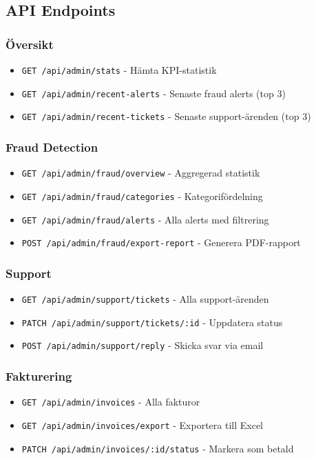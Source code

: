 \documentclass[12pt,a4paper]{article}
\begin{document}
\subsection{API Endpoints}

\subsubsection{Översikt}
\begin{itemize}
  \item \texttt{GET /api/admin/stats} - Hämta KPI-statistik
  \item \texttt{GET /api/admin/recent-alerts} - Senaste fraud alerts (top 3)
  \item \texttt{GET /api/admin/recent-tickets} - Senaste support-ärenden (top 3)
\end{itemize}

\subsubsection{Fraud Detection}
\begin{itemize}
  \item \texttt{GET /api/admin/fraud/overview} - Aggregerad statistik
  \item \texttt{GET /api/admin/fraud/categories} - Kategorifördelning
  \item \texttt{GET /api/admin/fraud/alerts} - Alla alerts med filtrering
  \item \texttt{POST /api/admin/fraud/export-report} - Generera PDF-rapport
\end{itemize}

\subsubsection{Support}
\begin{itemize}
  \item \texttt{GET /api/admin/support/tickets} - Alla support-ärenden
  \item \texttt{PATCH /api/admin/support/tickets/:id} - Uppdatera status
  \item \texttt{POST /api/admin/support/reply} - Skicka svar via email
\end{itemize}

\subsubsection{Fakturering}
\begin{itemize}
  \item \texttt{GET /api/admin/invoices} - Alla fakturor
  \item \texttt{GET /api/admin/invoices/export} - Exportera till Excel
  \item \texttt{PATCH /api/admin/invoices/:id/status} - Markera som betald
\end{itemize}
\end{document}
